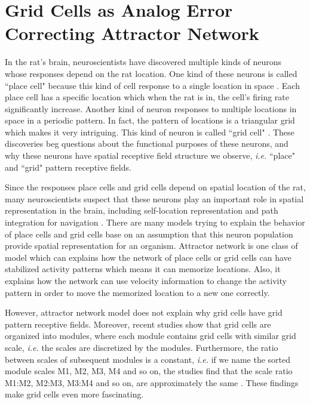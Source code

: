 \chapter{Grid Cells as Analog Error Correcting Attractor Network}
\label{chap:grid_cells}

In the rat's brain, neuroscientists have discovered multiple kinds of neurons whose responses depend on the rat location. One kind of these neurons is called ``place cell" because this kind of cell response to a single location in space \cite{oj71}. Each place cell has a specific location which when the rat is in, the cell's firing rate significantly increase. Another kind of neuron responses to multiple locations in space in a periodic pattern. In fact, the pattern of locations is a triangular grid which makes it very intriguing. This kind of neuron is called ``grid cell" \cite{ht05}. These discoveries beg questions about the functional purposes of these neurons, and why these neurons have spatial receptive field structure we observe, \textit{i.e.} ``place" and ``grid" pattern receptive fields.

Since the responses place cells and grid cells depend on spatial location of the rat, many neuroscientists suspect that these neurons play an important role in spatial representation in the brain, including self-location representation and path integration for navigation \cite{me08}. There are many models trying to explain the behavior of place cells and grid cells base on an assumption that this neuron population provide spatial representation for an organism. Attractor network is one class of model which can explains how the network of place cells \cite{ss02} or grid cells \cite{by09} can have stabilized activity patterns which means it can memorize locations. Also, it explains how the network can use velocity information to change the activity pattern in order to move the memorized location to a new one correctly.

However, attractor network model does not explain why grid cells have grid pattern receptive fields. Moreover, recent studies show that grid cells are organized into modules, where each module contains grid cells with similar grid scale, \textit{i.e.} the scales are discretized by the modules. Furthermore, the ratio between scales of subsequent modules is a constant, \textit{i.e.} if we name the sorted module scales M1, M2, M3, M4 and so on, the studies find that the scale ratio M1:M2, M2:M3, M3:M4 and so on, are approximately the same \cite{sh12, me14}. These findings make grid cells even more fascinating.

